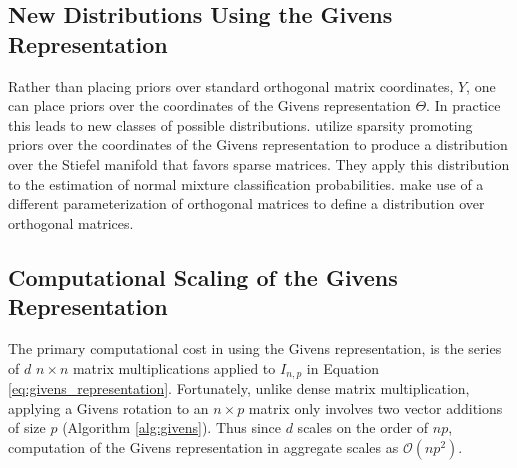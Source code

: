 \documentclass[ba]{imsart}
\numberwithin{equation}{section}
\theoremstyle{plain}
\begin{document}
\subsection{New Distributions Using the Givens Representation}
Rather than placing priors over standard orthogonal matrix coordinates, $Y$, one can place priors over the coordinates of the Givens representation $\Theta$. In practice this leads to new classes of possible distributions. \noindent \cite{cron2016models} utilize sparsity promoting priors over the coordinates of the Givens representation to produce a distribution over the Stiefel manifold that favors sparse matrices. They apply this distribution to the estimation of normal mixture classification probabilities. \cite{leon2006statistical} make use of a different parameterization of orthogonal matrices to define a distribution over orthogonal matrices.


\subsection{Computational Scaling of the Givens Representation}\label{scaling}
The primary computational cost in using the Givens representation, is the series of $d$ $n \times n$ matrix multiplications applied to $I_{n,p}$ in 
Equation \ref{eq:givens_representation}. Fortunately, unlike dense matrix multiplication, applying a Givens rotation to an $n \times p$ matrix only involves two vector additions of size $p$ (Algorithm \ref{alg:givens}). Thus since $d$ scales on the order of $np$, computation of the Givens representation in aggregate scales as $\mathcal{O}(np^2)$.
\end{document}
